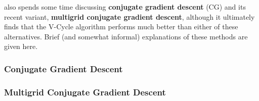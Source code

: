 \cite{lee14} also spends some time discussing \textbf{conjugate gradient descent} (CG) and its recent variant, \textbf{multigrid conjugate gradient descent}, although it ultimately finds that the V-Cycle algorithm performs much better than either of these alternatives. Brief (and somewhat informal) explanations of these methods are given here.
\subsubsection{Conjugate Gradient Descent}

\subsubsection{Multigrid Conjugate Gradient Descent}
